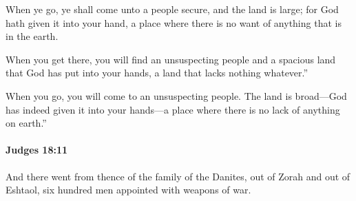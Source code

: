 			\begin{versebox}
					\item[BHS] 
					\item[ASV] When ye go, ye shall come unto a people secure, and the land is large; for God hath given it into your hand, a place where there is no want of anything that is in the earth.
					\item[NIV] When you get there, you will find an unsuspecting people and a spacious land that God has put into your hands, a land that lacks nothing whatever.”
					\item[NRSV] When you go, you will come to an unsuspecting people. The land is broad—God has indeed given it into your hands—a place where there is no lack of anything on earth.”
			\end{versebox}

		\paragraph{Judges 18:11} %
			\label{JUDGES-18-11}

			And there went from thence of the family of the Danites, out of Zorah and out of Eshtaol, six hundred men appointed with weapons of war.


